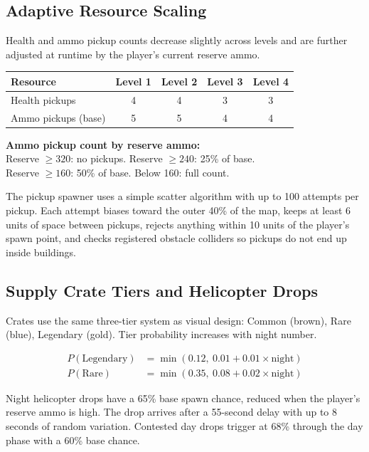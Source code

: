 \documentclass[11pt,a4paper]{article}
\begin{document}
\subsection{Adaptive Resource Scaling}

Health and ammo pickup counts decrease slightly across levels and are further adjusted at runtime by the player's current reserve ammo.

\begin{tcolorbox}[tableframe]
\small
\begin{tabular}{@{} l c c c c @{}}
\toprule
\textbf{Resource} & \textbf{Level 1} & \textbf{Level 2} & \textbf{Level 3} & \textbf{Level 4} \\
\midrule
Health pickups & 4 & 4 & 3 & 3 \\
Ammo pickups (base) & 5 & 5 & 4 & 4 \\
\bottomrule
\end{tabular}

\vspace{6pt}
\textbf{Ammo pickup count by reserve ammo:} \\
Reserve $\geq 320$: no pickups. \quad Reserve $\geq 240$: 25\% of base. \\
Reserve $\geq 160$: 50\% of base. \quad Below 160: full count.
\end{tcolorbox}

The pickup spawner uses a simple scatter algorithm with up to 100 attempts per pickup. Each attempt biases toward the outer 40\% of the map, keeps at least 6 units of space between pickups, rejects anything within 10 units of the player's spawn point, and checks registered obstacle colliders so pickups do not end up inside buildings.

\subsection{Supply Crate Tiers and Helicopter Drops}

Crates use the same three-tier system as visual design: Common (brown), Rare (blue), Legendary (gold). Tier probability increases with night number.

\begin{align*}
P(\mathrm{Legendary}) &= \min(0.12,\ 0.01 + 0.01 \times \mathrm{night}) \\
P(\mathrm{Rare}) &= \min(0.35,\ 0.08 + 0.02 \times \mathrm{night})
\end{align*}

Night helicopter drops have a 65\% base spawn chance, reduced when the player's reserve ammo is high. The drop arrives after a 55-second delay with up to 8 seconds of random variation. Contested day drops trigger at 68\% through the day phase with a 60\% base chance.
\end{document}
